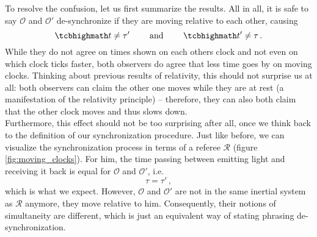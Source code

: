 To resolve the confusion, let us first summarize the results. All in all, it is safe to say $\mathcal{O}$ and $\mathcal{O}'$ de-synchronize if they are moving relative to each other, causing
\begin{equation}
	\eqbox{
	t \neq \tau'
	}
	\qquad \text{ and } \qquad
	\eqbox{
	t' \neq \tau
	} \, .
\end{equation}
While they do not agree on times shown on each others clock and not even on which clock ticks faster, both observers do agree that less time goes by on moving clocks. Thinking about previous results of relativity, this should not surprise us at all: both observers can claim the other one moves while they are at rest (a manifestation of the relativity principle) -- therefore, they can also both claim that the other clock moves and thus slows down.\\


Furthermore, this effect should not be too surprising after all, once we think back to the definition of our synchronization procedure. Just like before, we can visualize the synchronization process in terms of a referee $\mathcal{R}$ (figure \ref{fig:moving_clocks}). For him, the time passing between emitting light and receiving it back is equal for $\mathcal{O}$ and $\mathcal{O}'$, i.e.
\begin{equation}
	\tau = \tau' \, ,
\end{equation}
which is what we expect. However, $\mathcal{O}$ and $\mathcal{O}'$ are not in the same inertial system as $\mathcal{R}$ anymore, they move relative to him. Consequently, their notions of simultaneity are different, which is just an equivalent way of stating phrasing de-synchronization.



